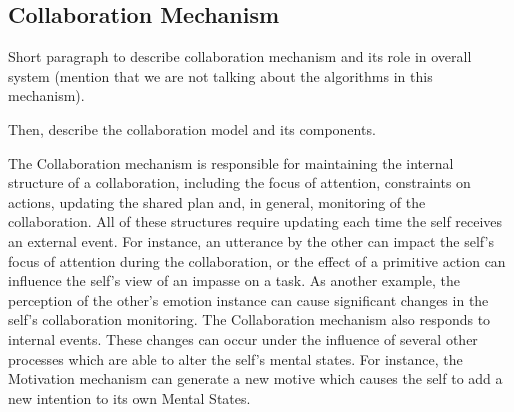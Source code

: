 \documentclass[letterpaper]{article}
\begin{document}
\subsection{Collaboration Mechanism}

Short paragraph to describe collaboration mechanism and its role in overall
system (mention that we are not talking about the algorithms in this mechanism).

Then, describe the collaboration model and its components.

The Collaboration mechanism is responsible for maintaining the internal
structure of a collaboration, including the focus of attention, constraints on
actions, updating the shared plan and, in general, monitoring of the
collaboration. All of these structures require updating each time the self
receives an external event. For instance, an utterance by the other can impact
the self's focus of attention during the collaboration, or the effect of a
primitive action can influence the self's view of an impasse on a task. As
another example, the perception of the other's emotion instance can cause
significant changes in the self's collaboration monitoring. The Collaboration
mechanism also responds to internal events. These changes can occur under the
influence of several other processes which are able to alter the self's mental
states. For instance, the Motivation mechanism can generate a new motive which
causes the self to add a new intention to its own Mental States.
\end{document}
